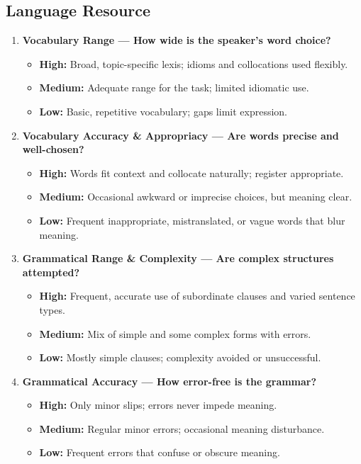 \documentclass{report}
\begin{document}
\subsection*{Language Resource}
\begin{enumerate}
  \item \textbf{Vocabulary Range — How wide is the speaker’s word choice?}
  \begin{itemize}
    \item \textbf{High:} Broad, topic-specific lexis; idioms and collocations used flexibly.
    \item \textbf{Medium:} Adequate range for the task; limited idiomatic use.
    \item \textbf{Low:} Basic, repetitive vocabulary; gaps limit expression.
  \end{itemize}

  \item \textbf{Vocabulary Accuracy \& Appropriacy — Are words precise and well-chosen?}
  \begin{itemize}
    \item \textbf{High:} Words fit context and collocate naturally; register appropriate.
    \item \textbf{Medium:} Occasional awkward or imprecise choices, but meaning clear.
    \item \textbf{Low:} Frequent inappropriate, mistranslated, or vague words that blur meaning.
  \end{itemize}

  \item \textbf{Grammatical Range \& Complexity — Are complex structures attempted?}
  \begin{itemize}
    \item \textbf{High:} Frequent, accurate use of subordinate clauses and varied sentence types.
    \item \textbf{Medium:} Mix of simple and some complex forms with errors.
    \item \textbf{Low:} Mostly simple clauses; complexity avoided or unsuccessful.
  \end{itemize}

  \item \textbf{Grammatical Accuracy — How error-free is the grammar?}
  \begin{itemize}
    \item \textbf{High:} Only minor slips; errors never impede meaning.
    \item \textbf{Medium:} Regular minor errors; occasional meaning disturbance.
    \item \textbf{Low:} Frequent errors that confuse or obscure meaning.
  \end{itemize}
\end{enumerate}
\end{document}
